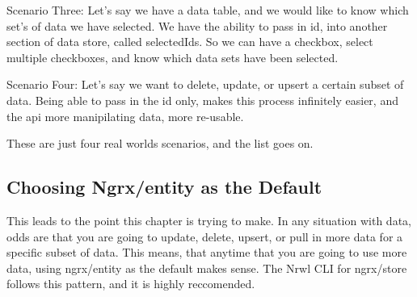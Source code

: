 Scenario Three:
Let's say we have a data table, and we would like to know which set's of data
we have selected. We have the ability to pass in id, into another section of
data store, called selectedIds. So we can have a checkbox, select multiple
checkboxes, and know which data sets have been selected.

Scenario Four:
Let's say we want to delete, update, or upsert a certain subset of data. Being
able to pass in the id only, makes this process infinitely easier, and the api
more manipilating data, more re-usable.

These are just four real worlds scenarios, and the list goes on.

\subsection{Choosing Ngrx/entity as the Default}
This leads to the point this chapter is trying to make. In any situation with
data, odds are that you are going to update, delete, upsert, or pull in more
data for a specific subset of data. This means, that anytime that you are going
to use more data, using ngrx/entity as the default makes sense. The Nrwl CLI
for ngrx/store follows this pattern, and it is highly reccomended.
